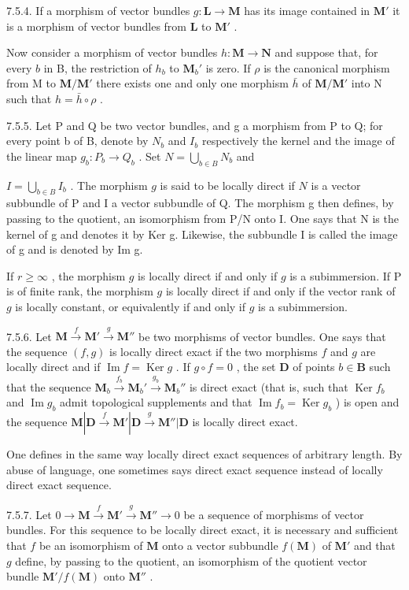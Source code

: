 7.5.4. If a morphism of vector bundles \(g: \mathbf{L} \to \mathbf{M}\) has its image contained in \(\mathbf{M}'\) it is a morphism of vector bundles from \(\mathbf{L}\) to \(\mathbf{M}'\) .

Now consider a morphism of vector bundles \(h: \mathbf{M} \to \mathbf{N}\) and suppose that, for every \(b\) in B, the restriction of \(h_b\) to \(\mathbf{M}_b'\) is zero. If \(\rho\) is the canonical morphism from M to \(\mathbf{M}/\mathbf{M}'\) there exists one and only one morphism \(\bar{h}\) of \(\mathbf{M}/\mathbf{M}'\) into N such that \(h = \bar{h} \circ \rho\) .

7.5.5. Let P and Q be two vector bundles, and g a morphism from P to Q; for every point b of B, denote by \(N_{b}\) and \(I_{b}\) respectively the kernel and the image of the linear map \(g_{b}:P_{b}\to Q_{b}\) . Set \(N=\bigcup_{b\in B}N_{b}\) and

\(I = \bigcup_{b \in B} I_b\) . The morphism \(g\) is said to be locally direct if \(N\) is a vector subbundle of P and I a vector subbundle of Q. The morphism g then defines, by passing to the quotient, an isomorphism from P/N onto I. One says that N is the kernel of g and denotes it by Ker g. Likewise, the subbundle I is called the image of g and is denoted by Im g.

If \(r \geqslant \infty\) , the morphism \(g\) is locally direct if and only if \(g\) is a subimmersion. If P is of finite rank, the morphism \(g\) is locally direct if and only if the vector rank of \(g\) is locally constant, or equivalently if and only if \(g\) is a subimmersion.

7.5.6. Let \(\mathbf{M} \xrightarrow{f} \mathbf{M}' \xrightarrow{g} \mathbf{M}''\) be two morphisms of vector bundles. One says that the sequence \((f, g)\) is locally direct exact if the two morphisms \(f\) and \(g\) are locally direct and if \(\operatorname{Im} f = \operatorname{Ker} g\) . If \(g \circ f = 0\) , the set \(\mathbf{D}\) of points \(b \in \mathbf{B}\) such that the sequence \(\mathbf{M}_b \xrightarrow{f_b} \mathbf{M}_b' \xrightarrow{g_b} \mathbf{M}_b''\) is direct exact (that is, such that \(\operatorname{Ker} f_b\) and \(\operatorname{Im} g_b\) admit topological supplements and that \(\operatorname{Im} f_b = \operatorname{Ker} g_b\) ) is open and the sequence \(\mathbf{M}|\mathbf{D} \xrightarrow{f} \mathbf{M}'|\mathbf{D} \xrightarrow{g} \mathbf{M}''|\mathbf{D}\) is locally direct exact.

One defines in the same way locally direct exact sequences of arbitrary length. By abuse of language, one sometimes says direct exact sequence instead of locally direct exact sequence.

7.5.7. Let \(0 \to \mathbf{M} \xrightarrow{f} \mathbf{M}' \xrightarrow{g} \mathbf{M}'' \to 0\) be a sequence of morphisms of vector bundles. For this sequence to be locally direct exact, it is necessary and sufficient that \(f\) be an isomorphism of \(\mathbf{M}\) onto a vector subbundle \(f(\mathbf{M})\) of \(\mathbf{M}'\) and that \(g\) define, by passing to the quotient, an isomorphism of the quotient vector bundle \(\mathbf{M}'/f(\mathbf{M})\) onto \(\mathbf{M}''\) .

